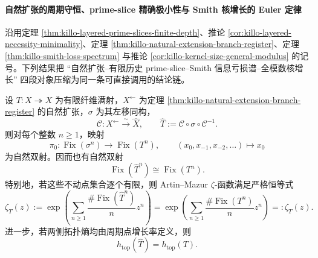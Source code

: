 \paragraph{自然扩张的周期守恒、prime-slice 精确极小性与 Smith 核增长的 Euler 定律}
沿用定理 \ref{thm:killo-layered-prime-slices-finite-depth}、推论
\ref{cor:killo-layered-necessity-minimality}、定理
\ref{thm:killo-natural-extension-branch-register}、定理
\ref{thm:killo-smith-loss-spectrum} 与推论
\ref{cor:killo-kernel-size-general-modulus} 的记号。下列结果把
“自然扩张--有限历史 prime-slice--Smith 信息亏损谱--全模数核增长”
四段对象压缩为同一条可直接调用的结论链。

\begin{theorem}\label{thm:xi-natural-extension-periodic-orbit-zeta-preservation}
设 \(T:X\twoheadrightarrow X\) 为有限纤维满射，\(X^{\leftarrow}\) 为定理
\ref{thm:killo-natural-extension-branch-register} 的自然扩张，\(\sigma\) 为其左移同构，
\[
\mathcal C:X^{\leftarrow}\xrightarrow{\sim}\widehat X,
\qquad
\widehat T:=\mathcal C\circ \sigma\circ \mathcal C^{-1}.
\]
则对每个整数 \(n\ge 1\)，映射
\[
\pi_0:\operatorname{Fix}(\sigma^n)\longrightarrow \operatorname{Fix}(T^n),
\qquad
(x_0,x_{-1},x_{-2},\dots)\longmapsto x_0
\]
为自然双射。因而也有自然双射
\[
\operatorname{Fix}(\widehat T^n)\cong \operatorname{Fix}(T^n).
\]
特别地，若这些不动点集合逐个有限，则 Artin--Mazur \(\zeta\)-函数满足严格恒等式
\[
\zeta_{\widehat T}(z)
:=
\exp\!\left(\sum_{n\ge 1}\frac{\#\operatorname{Fix}(\widehat T^n)}{n}z^n\right)
=
\exp\!\left(\sum_{n\ge 1}\frac{\#\operatorname{Fix}(T^n)}{n}z^n\right)
=:
\zeta_T(z).
\]
进一步，若两侧拓扑熵均由周期点增长率定义，则
\[
h_{\mathrm{top}}(\widehat T)=h_{\mathrm{top}}(T).
\]
\end{theorem}
